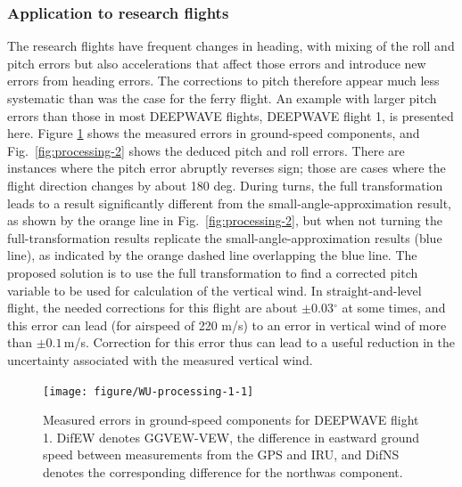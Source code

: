 \documentclass[12pt,twoside,english]{article}\usepackage[]{graphicx}\usepackage[]{color}
\newenvironment{knitrout}{}{} %
\let\OrgIndex\index
\renewcommand*{\index}[1]{\OrgIndex{#1}}
\begin{document}
\subsubsection{Application to research flights\label{sub:Application-to-research}}

The research flights have frequent changes in heading, with mixing of the roll and pitch errors but also accelerations that affect those errors and introduce new errors from heading errors. The corrections to pitch therefore appear much less systematic than was the case for the ferry flight. An example with larger pitch errors than those in most DEEPWAVE flights, DEEPWAVE flight 1, is presented here. Figure \ref{fig:processing-1} shows the measured errors in ground-speed components, and Fig.~\ref{fig:processing-2} shows the deduced pitch and roll errors. There are instances where the pitch error abruptly reverses sign; those are cases where the flight direction changes by about 180 deg. During turns, the full transformation leads to a result significantly different from the small-angle-approximation result, as shown by the orange line in Fig.~\ref{fig:processing-2}, but when not turning the full-transformation results replicate the small-angle-approximation results (blue line), as indicated by the orange dashed line overlapping the blue line. The proposed solution is to use the full transformation to find a corrected pitch variable to be used for calculation of the vertical wind. In straight-and-level flight, the needed corrections for this flight are about $\pm$0.03$^{\circ}$ at some times, and this error can lead (for airspeed of 220 m/s) to an error in vertical wind of more than $\pm0.1$\,m/s. Correction for this error thus can lead to a useful reduction in the uncertainty associated with the measured vertical wind. 

\begin{knitrout}\footnotesize
{}\color{fgcolor}\begin{figure}

{\centering \texttt{[image: figure/WU-processing-1-1]} 

}

\caption[Measured errors in ground-speed components for DEEPWAVE flight 1]{Measured errors in ground-speed components for DEEPWAVE flight 1. DifEW denotes GGVEW-VEW, the difference in eastward ground speed between measurements from the GPS and IRU, and DifNS denotes the corresponding difference for the northwas component.}\label{fig:processing-1}
\end{figure}


\end{knitrout}
\end{document}
